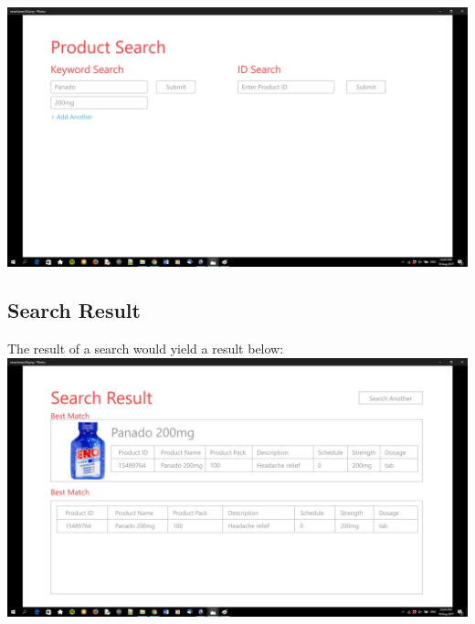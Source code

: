 \documentclass[a4paper,10pt]{article}
\begin{document}
	{\centering\includegraphics[width=15cm, scale=0.5]{smarctsearch5.jpg}} \\
	\subsection{Search Result}
	The result of a search would yield a result below: \\
	{\centering\includegraphics[width=15cm, scale=0.5]{smarctsearch6.jpg}} \\
	
\end{document}
